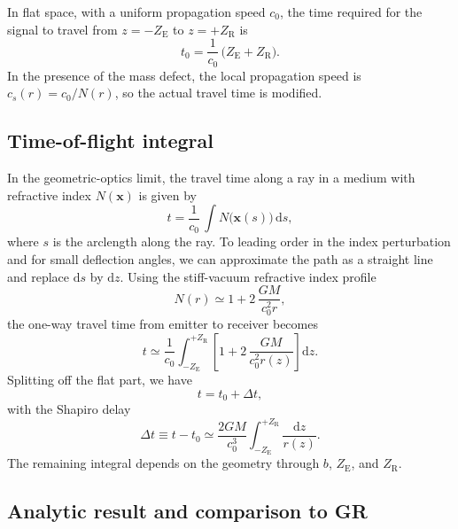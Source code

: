 \documentclass[11pt]{article}
\begin{document}
In flat space, with a uniform propagation speed $c_0$, the time required
for the signal to travel from $z=-Z_\mathrm{E}$ to $z=+Z_\mathrm{R}$ is
\begin{equation}
  t_0
  = \frac{1}{c_0}\,\bigl(Z_\mathrm{E} + Z_\mathrm{R}\bigr).
\end{equation}
In the presence of the mass defect, the local propagation speed is
$c_s(r) = c_0 / N(r)$, so the actual travel time is modified.


\subsection{Time-of-flight integral}
\label{subsec:shapiro-integral}

In the geometric-optics limit, the travel time along a ray in a medium with
refractive index $N(\mathbf{x})$ is given by
\begin{equation}
  t
  = \frac{1}{c_0}\,\int N\bigl(\mathbf{x}(s)\bigr)\,\mathrm{d}s,
\end{equation}
where $s$ is the arclength along the ray.
To leading order in the index perturbation and for small deflection angles,
we can approximate the path as a straight line and replace $\mathrm{d}s$ by
$\mathrm{d}z$.
Using the stiff-vacuum refractive index profile
\begin{equation}
  N(r)
  \simeq 1 + 2\,\frac{GM}{c_0^2 r},
\end{equation}
the one-way travel time from emitter to receiver becomes
\begin{equation}
  t
  \simeq \frac{1}{c_0}
         \int_{-Z_\mathrm{E}}^{+Z_\mathrm{R}}
         \left[1 + 2\,\frac{GM}{c_0^2 r(z)}\right]
         \mathrm{d}z.
  \label{eq:shapiro-t-integral}
\end{equation}
Splitting off the flat part, we have
\begin{equation}
  t
  = t_0 + \Delta t,
\end{equation}
with the Shapiro delay
\begin{equation}
  \Delta t
  \equiv t - t_0
  \simeq \frac{2GM}{c_0^3}
         \int_{-Z_\mathrm{E}}^{+Z_\mathrm{R}}
         \frac{\mathrm{d}z}{r(z)}.
  \label{eq:shapiro-dt-integral}
\end{equation}
The remaining integral depends on the geometry through $b$, $Z_\mathrm{E}$,
and $Z_\mathrm{R}$.


\subsection{Analytic result and comparison to GR}
\label{subsec:shapiro-analytic}
\end{document}
